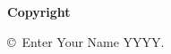 
\newpage

\thispagestyle{empty}

\vspace*{0.9cm}

\begin{center}

{\bf \Huge Copyright}

\vspace{1cm}


\Large\copyright\ Enter Your Name YYYY.\\

\vspace{0.5cm}

\end{center}
